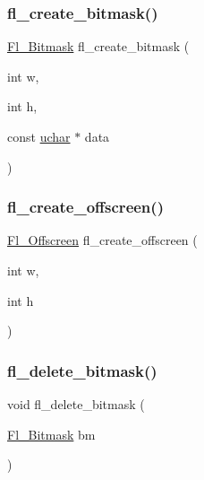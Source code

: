 \subsubsection{\texorpdfstring{fl\+\_\+create\+\_\+bitmask()}{fl\_create\_bitmask()}}
{\footnotesize\ttfamily \hyperlink{mac_8_h_a90133b6f8cfb11ab81d83b2c4d91310d}{Fl\+\_\+\+Bitmask} fl\+\_\+create\+\_\+bitmask (\begin{DoxyParamCaption}\item[{int}]{w,  }\item[{int}]{h,  }\item[{const \hyperlink{fl__types_8h_a65f85814a8290f9797005d3b28e7e5fc}{uchar} $\ast$}]{data }\end{DoxyParamCaption})}

\mbox{\label{mac_8_h_a22259d434be43b30f74bfb3e96c5fdab}} 
\subsubsection{\texorpdfstring{fl\+\_\+create\+\_\+offscreen()}{fl\_create\_offscreen()}}
{\footnotesize\ttfamily \hyperlink{mac_8_h_ad24d9679e17ea5ffa910ed355d4df340}{Fl\+\_\+\+Offscreen} fl\+\_\+create\+\_\+offscreen (\begin{DoxyParamCaption}\item[{int}]{w,  }\item[{int}]{h }\end{DoxyParamCaption})}

\mbox{\label{mac_8_h_aa5112223a06ba80ee3bbc0608e9ece75}} 
\subsubsection{\texorpdfstring{fl\+\_\+delete\+\_\+bitmask()}{fl\_delete\_bitmask()}}
{\footnotesize\ttfamily void fl\+\_\+delete\+\_\+bitmask (\begin{DoxyParamCaption}\item[{\hyperlink{mac_8_h_a90133b6f8cfb11ab81d83b2c4d91310d}{Fl\+\_\+\+Bitmask}}]{bm }\end{DoxyParamCaption})}

